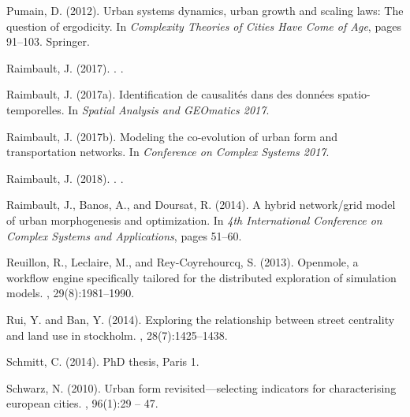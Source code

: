 \documentclass[11pt]{article}
\begin{document}
\begin{multicols}{2}
\begin{thebibliography}{}
Pumain, D. (2012).
\newblock Urban systems dynamics, urban growth and scaling laws: The question
  of ergodicity.
\newblock In {\em Complexity Theories of Cities Have Come of Age}, pages
  91--103. Springer.

{Raimbault}, J. (2017).
.
.

Raimbault, J. (2017a).
\newblock Identification de causalit{\'e}s dans des donn{\'e}es
  spatio-temporelles.
\newblock In {\em Spatial Analysis and GEOmatics 2017}.

Raimbault, J. (2017b).
\newblock Modeling the co-evolution of urban form and transportation networks.
\newblock In {\em Conference on Complex Systems 2017}.

{Raimbault}, J. (2018).
.
.

Raimbault, J., Banos, A., and Doursat, R. (2014).
\newblock A hybrid network/grid model of urban morphogenesis and optimization.
\newblock In {\em 4th International Conference on Complex Systems and
  Applications}, pages 51--60.

Reuillon, R., Leclaire, M., and Rey-Coyrehourcq, S. (2013).
\newblock Openmole, a workflow engine specifically tailored for the distributed
  exploration of simulation models.
, 29(8):1981--1990.

Rui, Y. and Ban, Y. (2014).
\newblock Exploring the relationship between street centrality and land use in
  stockholm.
,
  28(7):1425--1438.

Schmitt, C. (2014).
\newblock PhD thesis, Paris 1.

Schwarz, N. (2010).
\newblock Urban form revisited---selecting indicators for characterising
  european cities.
, 96(1):29 -- 47.


\end{thebibliography}
\end{multicols}
\end{document}
